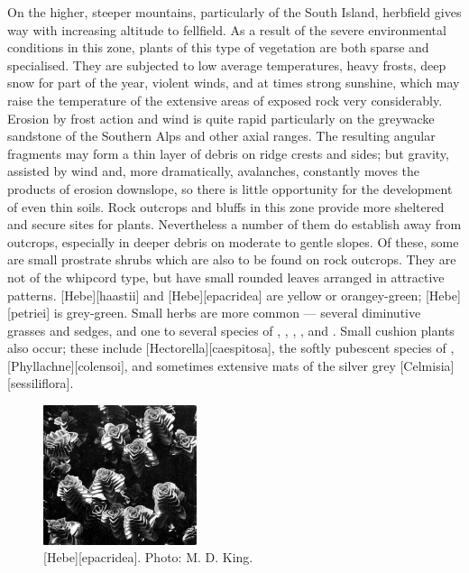 On the higher, steeper mountains, particularly of the South Island, herbfield gives way with increasing altitude to fellfield.
As a result of the severe environmental conditions in this zone, plants of this type of vegetation are both sparse and specialised.
They are subjected to low average temperatures, heavy frosts, deep snow for part of the year, violent winds, and at times strong sunshine, which may raise the temperature of the extensive areas of exposed rock very considerably.
Erosion by frost action and wind is quite rapid particularly on the greywacke sandstone of the Southern Alps and other axial ranges.
The resulting angular fragments may form a thin layer of debris on ridge crests and sides; but gravity, assisted by wind and, more dramatically, avalanches, constantly moves the products of erosion downslope, so there is little opportunity for the development of even thin soils.
Rock outcrops and bluffs in this zone provide more sheltered and secure sites for plants.
Nevertheless a number of them do establish away from outcrops, especially in deeper debris on moderate to gentle slopes.
Of these, some are small prostrate  shrubs which are also to be found on rock outcrops.
They are not of the whipcord type, but have small rounded leaves arranged in attractive patterns. [Hebe][haastii] and [Hebe][epacridea] are yellow or orangey-green; [Hebe][petriei] is grey-green.
Small herbs are more common --- several diminutive grasses and sedges, and one to several species of , , , ,  and .
Small cushion plants also occur; these include [Hectorella][caespitosa], the softly pubescent species of , [Phyllachne][colensoi], and sometimes extensive mats of the silver grey [Celmisia][sessiliflora].

\begin{figure}
	\includegraphics[width=0.4\textwidth]{graphics/figure106hebe.jpg}
	\centering
	\caption[\emph{Hebe epacridea}]{[Hebe][epacridea].
	Photo: M. D. King.}%
	\label{fig:106hebe}
\end{figure}


